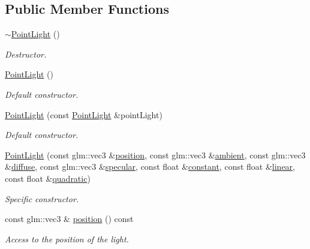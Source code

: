 \subsection*{Public Member Functions}
\begin{DoxyCompactItemize}
\item 
\hyperlink{classPointLight_aa12d9005d5372dbbe655a82231634341}{$\sim$\+Point\+Light} ()
\begin{DoxyCompactList}\small\item\em Destructor. \end{DoxyCompactList}\item 
\hyperlink{classPointLight_abbfdf5f05b559c49016f8bb97b0ca414}{Point\+Light} ()
\begin{DoxyCompactList}\small\item\em Default constructor. \end{DoxyCompactList}\item 
\hyperlink{classPointLight_a85e984228a1967b53114378b46a8f80a}{Point\+Light} (const \hyperlink{classPointLight}{Point\+Light} \&point\+Light)
\begin{DoxyCompactList}\small\item\em Default constructor. \end{DoxyCompactList}\item 
\hyperlink{classPointLight_a813f361fa033b13412a4c2268263b4de}{Point\+Light} (const glm\+::vec3 \&\hyperlink{classPointLight_a46ba05eb1117e13cf078fa0fe4d1579f}{position}, const glm\+::vec3 \&\hyperlink{classPointLight_a80a915d16e9b7576107ce23318c0d547}{ambient}, const glm\+::vec3 \&\hyperlink{classPointLight_a35474dabe9643e96eff5447f14b41a7b}{diffuse}, const glm\+::vec3 \&\hyperlink{classPointLight_aedd6ede28b41d05e277c26fcbfa1657d}{specular}, const float \&\hyperlink{classPointLight_afa1541cdc95ff0e7283c545e4aec2737}{constant}, const float \&\hyperlink{classPointLight_ad79e03bc6d87477bf0d2f00866531f6c}{linear}, const float \&\hyperlink{classPointLight_ac531ddcb6a17371501f30af9474c7d8c}{quadratic})
\begin{DoxyCompactList}\small\item\em Specific constructor. \end{DoxyCompactList}\item 
const glm\+::vec3 \& \hyperlink{classPointLight_a46ba05eb1117e13cf078fa0fe4d1579f}{position} () const 
\begin{DoxyCompactList}\small\item\em Access to the position of the light. \end{DoxyCompactList}\item 

\end{DoxyCompactItemize}
